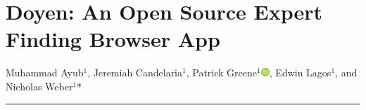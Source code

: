 \documentclass[11pt,twoside]{report} %
\begin{document}

%



\pagebreak





\vfill
\pagebreak





\chapter{Doyen: An Open Source Expert Finding Browser App}
Muhammad Ayub$^{1}$, Jeremiah Candelaria$^{1}$, Patrick Greene$^{1}$\href{https://orcid.org/0000-0001-7052-0608}{\includegraphics[width=0.32cm]{Images/logo-orcid.pdf}}, Edwin Lagos$^{1}$, and Nicholas Weber$^{1}$*
\vspace{0.8cm}
\hrule

 

{
\small

\setlength{\columnsep}{30pt}
\begin{multicols}{2}











\end{multicols}









\vfill
\pagebreak
}
\end{document}
